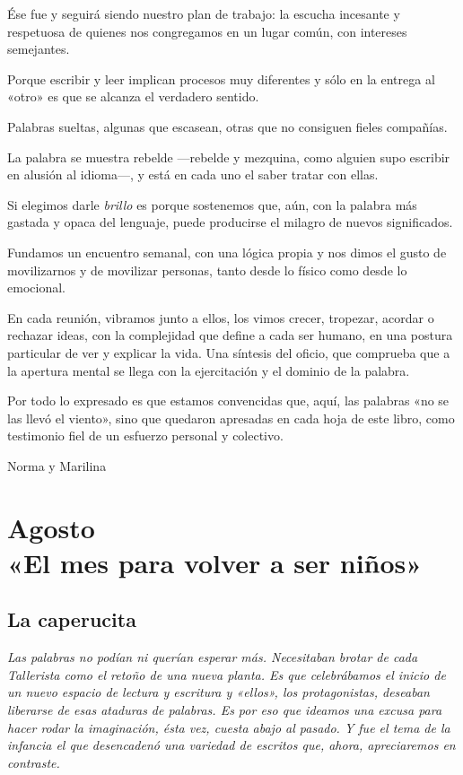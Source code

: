 \documentclass[11pt,twoside,openright,a5paper]{book}
\begin{document}
Ése fue y seguirá siendo nuestro plan de trabajo: la escucha incesante y respetuosa de quienes nos congregamos en un lugar común, con intereses  semejantes.

Porque escribir y leer implican procesos muy diferentes y sólo en la entrega al «otro» es que se alcanza el verdadero sentido.

Palabras sueltas, algunas que escasean, otras que no consiguen fieles compañías. 

La palabra se muestra rebelde ---rebelde y mezquina, como alguien supo escribir en alusión al idioma---, y está en cada uno el saber tratar con ellas.

Si elegimos darle \emph{brillo} es porque sostenemos que, aún, con la palabra más gastada y opaca del lenguaje, puede producirse el milagro de nuevos significados.

Fundamos un encuentro semanal, con una lógica propia y nos dimos el gusto de movilizarnos y de movilizar personas, tanto desde lo físico como desde  lo emocional.

En cada reunión, vibramos  junto  a ellos, los vimos crecer, tropezar, acordar o rechazar ideas, con la complejidad que define a cada ser humano, en una postura particular de ver y explicar la vida. Una síntesis del oficio, que comprueba que a la apertura mental se  llega con la ejercitación y el dominio de la palabra.

Por todo lo expresado es que estamos convencidas que, aquí,  las palabras «no se las llevó el viento», sino  que quedaron apresadas en cada hoja de este libro, como testimonio fiel de un esfuerzo personal y colectivo.

\begin{flushright}Norma y Marilina\end{flushright}

\part*{Agosto\\«El mes para volver a ser niños»}
\chapter*{La caperucita}

\vspace{0.5cm}
\emph{Las palabras no podían ni querían esperar más. Necesitaban brotar de cada Tallerista como el retoño de una nueva planta. Es que celebrábamos el inicio de un nuevo espacio de lectura y escritura y «ellos», los protagonistas, deseaban liberarse de esas \emph{ataduras} de palabras. Es por eso que ideamos una excusa para hacer rodar la imaginación, ésta vez, cuesta abajo al pasado. Y fue el tema de la infancia el que desencadenó una variedad de escritos que, ahora, apreciaremos en contraste.}
\end{document}

